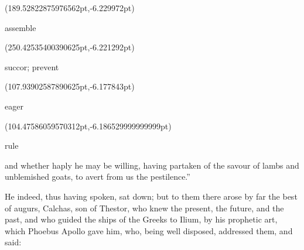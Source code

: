 \documentclass{ransom}
\begin{document}
\begin{foreignpage}
{\begin{textblock*}{33.47726pt}(189.52822875976562pt,\pdfpageheight-287.3775939941406pt-6.229972pt)\parbox[b]{33.47726pt}{\begin{blacktext}\begin{latin}assemble\end{latin}\end{blacktext}}\end{textblock*}
\begin{textblock*}{42.0pt}(250.42535400390625pt,\pdfpageheight-260.3775939941406pt-6.221292pt)\parbox[b]{42.0pt}{\begin{blacktext}\begin{latin}succor; prevent\end{latin}\end{blacktext}}\end{textblock*}
\begin{textblock*}{47.30511pt}(107.93902587890625pt,\pdfpageheight-260.3775939941406pt-6.177843pt)\parbox[b]{47.30511pt}{\begin{blacktext}\begin{latin}eager\end{latin}\end{blacktext}}\end{textblock*}
\begin{textblock*}{37.41212pt}(104.47586059570312pt,\pdfpageheight-206.37759399414062pt-6.186529999999999pt)\parbox[b]{37.41212pt}{\begin{blacktext}\begin{latin}rule\end{latin}\end{blacktext}}\end{textblock*}
 }
\end{foreignpage}


and whether haply he may be willing, having partaken of the savour of
lambs and unblemished goats, to avert from us the pestilence.”





He indeed, thus having spoken, sat down; but to them there arose by far
the best of augurs, Calchas, son of Thestor, who knew the present, the
future, and the past, and who guided the ships of the Greeks to
Ilium, by his prophetic art, which Phoebus Apollo gave him, who, being
well disposed, addressed them, and said:
\end{document}
